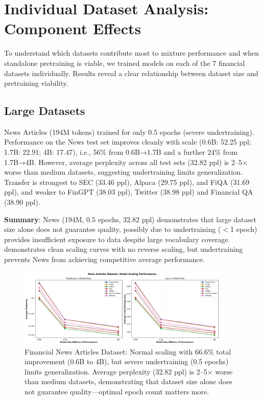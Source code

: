 \section{Individual Dataset Analysis: Component Effects}

To understand which datasets contribute most to mixture performance and when standalone pretraining is viable, we trained models on each of the 7 financial datasets individually. Results reveal a clear relationship between dataset size and pretraining viability.

\subsection{Large Datasets}

News Articles (194M tokens) trained for only 0.5 epochs (severe undertraining). Performance on the News test set improves cleanly with scale (0.6B: 52.25 ppl; 1.7B: 22.91; 4B: 17.47), i.e., 56\% from 0.6B→1.7B and a further 24\% from 1.7B→4B. However, average perplexity across all test sets (32.82 ppl) is 2–5$\times$ worse than medium datasets, suggesting undertraining limits generalization. Transfer is strongest to SEC (33.46 ppl), Alpaca (29.75 ppl), and FiQA (31.69 ppl), and weaker to FinGPT (38.03 ppl), Twitter (38.98 ppl) and Financial QA (38.90 ppl).

\textbf{Summary}: News (194M, 0.5 epochs, 32.82 ppl) demonstrates that large dataset size alone does not guarantee quality, possibly due to undertraining ($<$1 epoch) provides insufficient exposure to data despite large vocabulary coverage.  demonstrates clean scaling curves with no reverse scaling, but undertraining prevents News from achieving competitive average performance.

\begin{figure}[htbp]
\centering
\includegraphics[width=0.9\textwidth]{figures/scaling_news_articles.png}
\caption[Financial News Dataset: Scaling Behavior]{Financial News Articles Dataset: Normal scaling with 66.6\% total improvement (0.6B to 4B), but severe undertraining (0.5 epochs) limits generalization. Average perplexity (32.82 ppl) is 2–5$\times$ worse than medium datasets, demonstrating that dataset size alone does not guarantee quality—optimal epoch count matters more.}
\label{fig:scaling_news_articles}
\end{figure}

